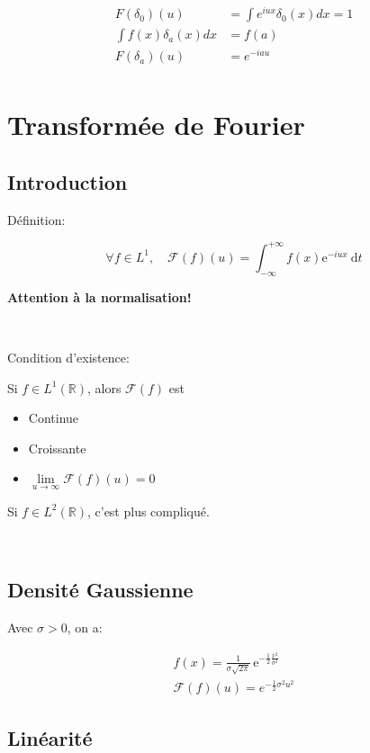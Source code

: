 \documentclass[a4paper,11pt]{article}
\begin{document}
\begin{align*}
  F(\delta_0)(u) &= \int e^{iux} \delta_0(x)dx = 1\\
  \int f(x)\delta_a(x)dx &= f(a)\\
  F(\delta_a)(u) &= e^{-iau}\\
\end{align*}

\section{Transformée de Fourier}

\subsection{Introduction}

Définition:

$$ \forall f \in L^{1}, \quad \mathcal{F}(f)(u) = \int^{+\infty}_{-\infty} f(x) \mathrm{e}^{-iux} \: \mathrm{d} t $$

\textbf{Attention à la normalisation!}

\

Condition d'existence:

Si $ f \in L^1(\mathbb{R}) $, alors $\mathcal{F}(f)$ est

\begin{itemize}
\item Continue
\item Croissante
\item $ \underset{u \to \infty}{\lim} \mathcal{F}(f)(u) = 0 $
\end{itemize}

Si $f \in L^2(\mathbb{R})$, c'est plus compliqué.

\

\subsection{Densité Gaussienne}

Avec $\sigma > 0$, on a:

\begin{align*}
  f(x) = \frac{1}{\sigma \sqrt{2\pi}} \, \mathrm{e}^{-\frac{1}{2}\frac{x^2}{\sigma^2}}\\
  \mathcal{F}(f)(u) = e^{- \frac{1}{2} \sigma^2 u^2}
\end{align*}


\subsection{Linéarité}
\end{document}
